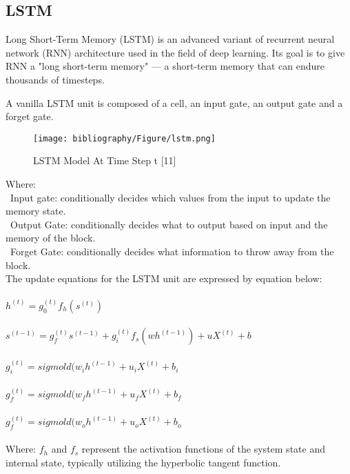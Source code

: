 \documentclass{ieeeojies}
\begin{document}
\subsection{LSTM}
Long Short-Term Memory (LSTM) is an advanced variant of recurrent neural network (RNN) architecture used in the field of deep learning. Its goal is to give RNN a "long short-term memory" — a short-term memory that can endure thousands of timesteps.

A vanilla LSTM unit is composed of a cell, an input gate, an output gate and a forget gate.

\begin{figure}[H]
  \centering
  \begin{minipage}{0.8\linewidth}
    \centering
    \texttt{[image: bibliography/Figure/lstm.png]}
    \caption{LSTM Model At Time Step t [11]}
    \label{fig9}
  \end{minipage}
\end{figure}

Where:\\
\indent\textbullet\ Input gate: conditionally decides which values from the input to update the memory state.\\
\indent\textbullet\ Output Gate: conditionally decides what to output based on input and the memory of the block.\\
\indent\textbullet\ Forget Gate: conditionally decides what information to throw away from the block.\\

The update equations for the LSTM unit are expressed by equation below: \\
\\$h^{(t)} = g_0^{(t)}f_h(s^{(t)})$ \quad[11]\\
\\$s^{(t-1)} = g_f^{(t)}s^{(t-1)} + g_i^{(t)}f_s(wh^{(t-1)}) + uX^{(t)} + b$ \quad[11]\\
\\$g_i^{(t)} = sigmold (w_ih^{(t-1)} + u_iX^{(t)} + b_i$ \quad[11]\\
\\$g_f^{(t)} = sigmold (w_fh^{(t-1)} + u_fX^{(t)} + b_f$ \quad[11]\\
\\$g_f^{(t)} = sigmold (w_oh^{(t-1)} + u_oX^{(t)} + b_o$ \quad[11]\\
\\ Where: $f_h$ and $f_s$
represent the activation functions of the 
system state and internal state, typically utilizing the 
hyperbolic tangent function.
\end{document}
